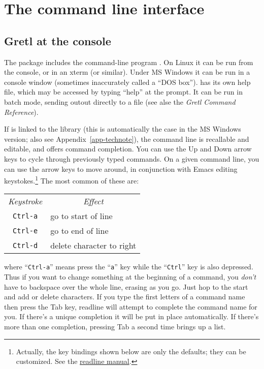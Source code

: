 \chapter{The command line interface}
\label{cli}

\section{Gretl at the console}
\label{cli-console}

The  package includes the command-line program
. On Linux it can be run from the console, or in an
xterm (or similar).  Under MS Windows it can be run in a console
window (sometimes inaccurately called a ``DOS box'').  
has its own help file, which may be accessed by typing ``help'' at the
prompt. It can be run in batch mode, sending outout directly to a file
(see alse the \emph{Gretl Command Reference}).
    
If  is linked to the  library (this is
automatically the case in the MS Windows version; also see
Appendix~\ref{app-technote}), the command line is recallable and
editable, and offers command completion.  You can use the Up and Down
arrow keys to cycle through previously typed commands.  On a given
command line, you can use the arrow keys to move around, in
conjunction with Emacs editing keystokes.\footnote{Actually, the key
  bindings shown below are only the defaults; they can be customized.
  See the
  \href{http://cnswww.cns.cwru.edu/~chet/readline/readline.html}{readline
    manual}.} The most common of these are:
%    
\begin{center}
  \begin{tabular}{cl}
    \textit{Keystroke} & \multicolumn{1}{c}{\textit{Effect}}\\
    \verb+Ctrl-a+ & go to start of line\\
    \verb+Ctrl-e+ & go to end of line\\
    \verb+Ctrl-d+ & delete character to right\\
  \end{tabular}
\end{center}
%
where ``\verb+Ctrl-a+'' means press the ``\verb+a+'' key while the
``\verb+Ctrl+'' key is also depressed.  Thus if you want to change
something at the beginning of a command, you \emph{don't} have to
backspace over the whole line, erasing as you go.  Just hop to the
start and add or delete characters.  If you type the first letters of
a command name then press the Tab key, readline will attempt to
complete the command name for you.  If there's a unique completion it
will be put in place automatically.  If there's more than one
completion, pressing Tab a second time brings up a list.

